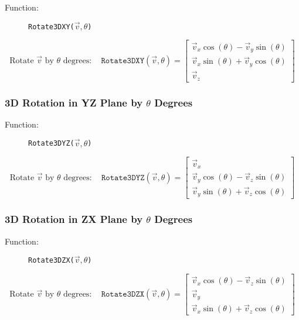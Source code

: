 \documentclass{article}
\begin{document}
\begin{description}
\item[Function:] \texttt{Rotate3DXY(\(\vec{v}, \theta\))}
\end{description}

\[
\text{Rotate } \vec{v} \text{ by } \theta \text{ degrees} : \quad \texttt{Rotate3DXY}(\vec{v}, \theta) = \begin{bmatrix}
\vec{v}_x \cos(\theta) - \vec{v}_y \sin(\theta) \\
\vec{v}_x \sin(\theta) + \vec{v}_y \cos(\theta) \\
\vec{v}_z
\end{bmatrix}
\]

\subsubsection{3D Rotation in YZ Plane by \(\theta\) Degrees}

\begin{description}
\item[Function:] \texttt{Rotate3DYZ(\(\vec{v}, \theta\))}
\end{description}

\[
\text{Rotate } \vec{v} \text{ by } \theta \text{ degrees} : \quad \texttt{Rotate3DYZ}(\vec{v}, \theta) = \begin{bmatrix}
\vec{v}_x \\
\vec{v}_y \cos(\theta) - \vec{v}_z \sin(\theta) \\
\vec{v}_y \sin(\theta) + \vec{v}_z \cos(\theta)
\end{bmatrix}
\]

\subsubsection{3D Rotation in ZX Plane by \(\theta\) Degrees}

\begin{description}
\item[Function:] \texttt{Rotate3DZX(\(\vec{v}, \theta\))}
\end{description}

\[
\text{Rotate } \vec{v} \text{ by } \theta \text{ degrees} : \quad \texttt{Rotate3DZX}(\vec{v}, \theta) = \begin{bmatrix}
\vec{v}_x \cos(\theta) - \vec{v}_z \sin(\theta) \\
\vec{v}_y \\
\vec{v}_x \sin(\theta) + \vec{v}_z \cos(\theta)
\end{bmatrix}
\]
\end{document}
